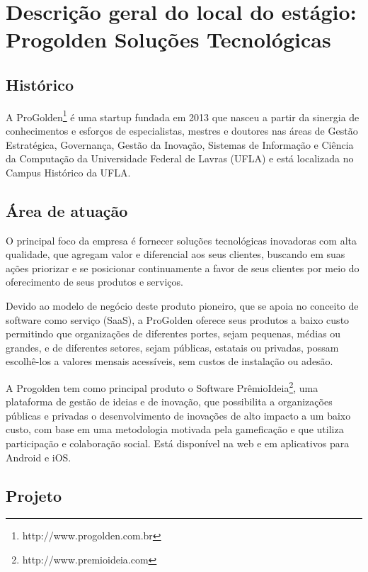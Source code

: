 \chapter{Descrição geral do local do estágio: Progolden Soluções Tecnológicas}

\section{Histórico}

A ProGolden\footnote{http://www.progolden.com.br} é uma startup fundada em 2013 que nasceu a partir da sinergia de conhecimentos e esforços de especialistas, mestres e doutores nas áreas de Gestão Estratégica, Governança, Gestão da Inovação, Sistemas de Informação e Ciência da Computação da Universidade Federal de Lavras (UFLA) e está localizada no Campus Histórico da UFLA.



\section{Área de atuação}

O principal foco da empresa é fornecer soluções tecnológicas inovadoras com alta qualidade, que agregam valor e diferencial aos seus clientes, buscando em suas ações priorizar e se posicionar continuamente a favor de seus clientes por meio do oferecimento de seus produtos e serviços. 

Devido ao modelo de negócio deste produto pioneiro, que se apoia no conceito de software como serviço (SaaS), a ProGolden oferece seus produtos a baixo custo permitindo que organizações de diferentes portes, sejam pequenas, médias ou grandes, e de diferentes setores, sejam públicas, estatais ou privadas, possam escolhê-los a valores mensais acessíveis, sem custos de instalação ou adesão. 

A Progolden tem como principal produto o Software PrêmioIdeia\footnote{http://www.premioideia.com},
uma plataforma de gestão de ideias e de inovação, que possibilita a organizações públicas e privadas o desenvolvimento de inovações de alto impacto a um baixo custo, com base em uma metodologia motivada pela gameficação e que utiliza participação e colaboração social. Está disponível na web e em aplicativos para Android e iOS.

\section{Projeto}


